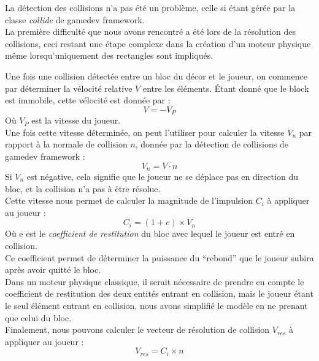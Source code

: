 \documentclass[10pt]{report}
\begin{document}
La détection des collisions n'a pas été un problème, celle si étant gérée par
la classe \emph{collide} de gamedev framework.\\
La première difficulté que nous avons rencontré a été lors de la résolution des collisions,
ceci restant une étape complexe dans la création d'un moteur physique même lorsqu'uniquement
des rectangles sont impliqués.

Une fois une collision détectée entre un bloc du décor et le joueur, on commence par déterminer la
vélocité relative \(V\) entre les éléments.
Étant donné que le block est immobile, cette vélocité est donnée par :
\[ V =  - V_{P} \]
Où \(V_{P}\) est la vitesse du joueur.\\
Une fois cette vitesse déterminée, on peut l'utiliser pour calculer la vitesse \(V_{n}\) par rapport à la
normale de collision \(n\), donnée par la détection de collisions de gamedev framework :
\[ V_{n} = V \cdot n \]
Si \(V_{n}\) est négative, cela signifie que le joueur ne se déplace pas en direction du bloc,
et la collision n'a pas à être résolue.\\
Cette vitesse nous permet de calculer la magnitude de l'impulsion \(C_{i}\) à appliquer au joueur :\\
\[ C_{i} = (1 + e) \times V_{n} \]
Où e est le \emph{coefficient de restitution} du bloc avec lequel le joueur est entré en collision.\\
Ce coefficient permet de déterminer la puissance du ``rebond'' que le joueur subira après avoir quitté le bloc.\\
Dans un moteur physique classique, il serait nécessaire de prendre en compte le coefficient de restitution des
deux entités entrant en collision, mais le joueur étant le seul élément entrant en collision,
nous avons simplifié le modèle en ne prenant que celui du bloc.\\
Finalement, nous pouvons calculer le vecteur de résolution de collision \(V_{res}\) à appliquer au joueur :
\[V_{res} = C_{i} \times n \]
\end{document}
